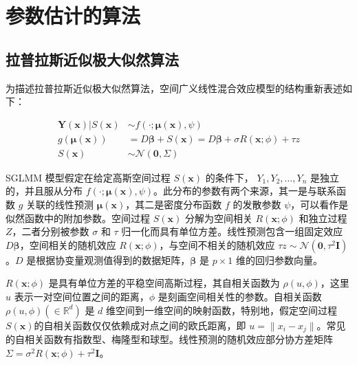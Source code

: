 \documentclass[12pt,a4paper,UTF8,twoside]{book}
\theoremstyle{definition}
\theoremstyle{definition}
\theoremstyle{definition}
\theoremstyle{remark}
\begin{document}
\hypertarget{sec:algrithms}{%
\section{参数估计的算法}\label{sec:algrithms}}

\hypertarget{subsec:LA}{%
\subsection{拉普拉斯近似极大似然算法}\label{subsec:LA}}

为描述拉普拉斯近似极大似然算法，空间广义线性混合效应模型的结构重新表述如下：

\begin{equation}
\begin{aligned}
\mathbf{Y(x)} | S(\mathbf{x}) & \sim  f(\cdot;\boldsymbol{\mu(x)},\psi) \\
g(\boldsymbol{\mu}(\mathbf{x})) & =  D\boldsymbol{\beta} + S(\mathbf{x}) 
                         = D\boldsymbol{\beta} + \sigma R(\mathbf{x};\phi) + \tau z \\
S(\mathbf{x}) & \sim  \mathcal{N}(\mathbf{0},\Sigma)
\end{aligned} \label{eq:sglmm}
\end{equation}

\noindent SGLMM 模型假定在给定高斯空间过程 \(S(\mathbf{x})\) 的条件下， \(Y_1,Y_2,\ldots,Y_n\) 是独立的，并且服从分布 \(f(\cdot;\boldsymbol{\mu}(\mathbf{x}),\psi)\)。此分布的参数有两个来源，其一是与联系函数 \(g\) 关联的线性预测 \(\boldsymbol{\mu}(\mathbf{x})\)，其二是密度分布函数 \(f\) 的发散参数 \(\psi\)，可以看作是似然函数中的附加参数。空间过程 \(S(\mathbf{x})\) 分解为空间相关 \(R(\mathbf{x};\phi)\) 和独立过程 \(Z\)，二者分别被参数 \(\sigma\) 和 \(\tau\) 归一化而具有单位方差。线性预测包含一组固定效应 \(D\boldsymbol{\beta}\)，空间相关的随机效应 \(R(\mathbf{x};\phi)\)，与空间不相关的随机效应 \(\tau z \sim \mathcal{N}(\mathbf{0},\tau^2\mathbf{I})\)。\(D\) 是根据协变量观测值得到的数据矩阵，\(\boldsymbol{\beta}\) 是 \(p \times 1\) 维的回归参数向量。

\(R(\mathbf{x};\phi)\) 是具有单位方差的平稳空间高斯过程，其自相关函数为 \(\rho(u,\phi)\)，这里 \(u\) 表示一对空间位置之间的距离，\(\phi\) 是刻画空间相关性的参数。自相关函数 \(\rho(u,\phi) (\in \mathbb{R}^d)\) 是 \(d\) 维空间到一维空间的映射函数，特别地，假定空间过程 \(S(\mathbf{x})\)的自相关函数仅仅依赖成对点之间的欧氏距离，即 \(u =\|x_i - x_j\|\)。常见的自相关函数有指数型、梅隆型和球型。线性预测的随机效应部分协方差矩阵 \(\Sigma = \sigma^2 R(\mathbf{x};\phi) + \tau^2\mathbf{I}\)。
\end{document}
